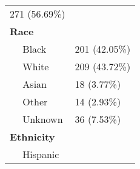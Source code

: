 \documentclass[
]{article}
\begin{document}
\begin{longtable}[]{@{}ll@{}}
\begin{minipage}[t]{0.21\columnwidth}
271 (56.69\%)\strut
\end{minipage}\tabularnewline
\begin{minipage}[t]{0.73\columnwidth}\raggedright
\textbf{Race}\strut
\end{minipage} & \begin{minipage}[t]{0.21\columnwidth}\raggedright
~~\strut
\end{minipage}\tabularnewline
\begin{minipage}[t]{0.73\columnwidth}\raggedright
~~ Black\strut
\end{minipage} & \begin{minipage}[t]{0.21\columnwidth}\raggedright
201 (42.05\%)\strut
\end{minipage}\tabularnewline
\begin{minipage}[t]{0.73\columnwidth}\raggedright
~~ White\strut
\end{minipage} & \begin{minipage}[t]{0.21\columnwidth}\raggedright
209 (43.72\%)\strut
\end{minipage}\tabularnewline
\begin{minipage}[t]{0.73\columnwidth}\raggedright
~~ Asian\strut
\end{minipage} & \begin{minipage}[t]{0.21\columnwidth}\raggedright
18 (3.77\%)\strut
\end{minipage}\tabularnewline
\begin{minipage}[t]{0.73\columnwidth}\raggedright
~~ Other\strut
\end{minipage} & \begin{minipage}[t]{0.21\columnwidth}\raggedright
14 (2.93\%)\strut
\end{minipage}\tabularnewline
\begin{minipage}[t]{0.73\columnwidth}\raggedright
~~ Unknown\strut
\end{minipage} & \begin{minipage}[t]{0.21\columnwidth}\raggedright
36 (7.53\%)\strut
\end{minipage}\tabularnewline
\begin{minipage}[t]{0.73\columnwidth}\raggedright
\textbf{Ethnicity}\strut
\end{minipage} & \begin{minipage}[t]{0.21\columnwidth}\raggedright
~~\strut
\end{minipage}\tabularnewline
\begin{minipage}[t]{0.73\columnwidth}\raggedright
~~ Hispanic\strut
\end{minipage} & \begin{minipage}[t]{0.21\columnwidth}\raggedright

\end{minipage}
\end{longtable}
\end{document}
